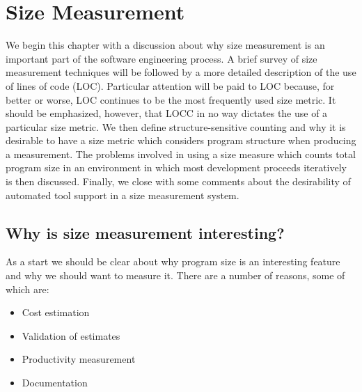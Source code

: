 
\chapter{Size Measurement}
\label{chap:size}

We begin this chapter with a discussion about why size measurement is an
important part of the software engineering process. A brief survey of size
measurement techniques will be followed by a more detailed description of
the use of lines of code (LOC).  Particular attention will be paid to LOC
because, for better or worse, LOC continues to be the most frequently used
size metric. It should be emphasized, however, that LOCC in no way dictates the
use of a particular size metric.  We then define structure-sensitive
counting and why it is desirable to have a size metric which considers
program structure when producing a measurement.  The problems involved in
using a size measure which counts total program size in an environment in
which most development proceeds iteratively is then discussed. Finally, we
close with some comments about the desirability of automated tool support
in a size measurement system.

\section{Why is size measurement interesting?}

As a start we should be clear about why program size is an interesting
feature and why we should want to measure it.  There are a number of
reasons, some of which are:

\begin{itemize}

\item Cost estimation 

\item Validation of estimates

\item Productivity measurement 

\item Documentation

\end{itemize}

